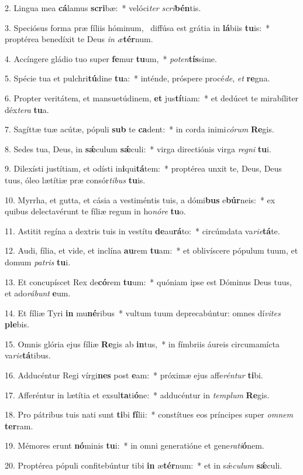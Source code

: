 2. Lingua mea \textbf{cá}lamus \textbf{scri}bæ:~*  velóci\textit{ter} \textit{scri}\textbf{bén}tis.\

3. Speciósus forma præ fíliis hóminum, \dag\  diffúsa est grátia in \textbf{lá}biis \textbf{tu}is:~*  proptérea benedíxit te Deus \textit{in} \textit{æ}\textbf{tér}num.\

4. Accíngere gládio tuo super \textbf{fe}mur \textbf{tu}um,~*  \textit{pot}\textit{en}\textbf{tís}sime.\

5. Spécie tua et pulchri\textbf{tú}dine \textbf{tu}a:~*  inténde, próspere procé\textit{de}, \textit{et} \textbf{re}gna.\

6. Propter veritátem, et mansuetúdinem, \textbf{et} jus\textbf{tí}tiam:~*  et dedúcet te mirabíliter déx\textit{te}\textit{ra} \textbf{tu}a.\

7. Sagíttæ tuæ acútæ, pópuli \textbf{sub} te \textbf{ca}dent:~*  in corda inimi\textit{có}\textit{rum} \textbf{Re}gis.\

8. Sedes tua, Deus, in \textbf{sǽ}culum \textbf{sǽ}culi:~*  virga directiónis virga \textit{re}\textit{gni} \textbf{tu}i.\

9. Dilexísti justítiam, et odísti in\textbf{i}qui\textbf{tá}tem:~*  proptérea unxit te, Deus, Deus tuus, óleo lætítiæ præ consór\textit{ti}\textit{bus} \textbf{tu}is.\

10. Myrrha, et gutta, et cásia a vestiméntis tuis, a dómi\textbf{bus} e\textbf{búr}neis:~*  ex quibus delectavérunt te fíliæ regum in ho\textit{nó}\textit{re} \textbf{tu}o.\

11. Astitit regína a dextris tuis in vestítu \textbf{de}au\textbf{rá}to:~*  circúmdata va\textit{ri}\textit{e}\textbf{tá}te.\

12. Audi, fília, et vide, et inclína \textbf{au}rem \textbf{tu}am:~*  et oblivíscere pópulum tuum, et domum \textit{pa}\textit{tris} \textbf{tu}i.\

13. Et concupíscet Rex de\textbf{có}rem \textbf{tu}um:~*  quóniam ipse est Dóminus Deus tuus, et ado\textit{rá}\textit{bunt} \textbf{e}um.\

14. Et fíliæ Tyri \textbf{in} mu\textbf{né}ribus~*  vultum tuum deprecabúntur: omnes dí\textit{vi}\textit{tes} \textbf{ple}bis.\

15. Omnis glória ejus fíliæ \textbf{Re}gis ab \textbf{in}tus,~*  in fímbriis áureis circumamícta va\textit{ri}\textit{e}\textbf{tá}tibus.\

16. Adducéntur Regi vírgi\textbf{nes} post \textbf{e}am:~*  próximæ ejus affe\textit{rén}\textit{tur} \textbf{ti}bi.\

17. Afferéntur in lætítia et exsul\textbf{ta}ti\textbf{ó}ne:~*  adducéntur in \textit{tem}\textit{plum} \textbf{Re}gis.\

18. Pro pátribus tuis nati sunt \textbf{ti}bi \textbf{fí}lii:~*  constítues eos príncipes super \textit{om}\textit{nem} \textbf{ter}ram.\

19. Mémores erunt \textbf{nó}minis \textbf{tu}i:~*  in omni generatióne et gene\textit{ra}\textit{ti}\textbf{ó}nem.\

20. Proptérea pópuli confitebúntur tibi \textbf{in} æ\textbf{tér}num:~*  et in sǽ\textit{cu}\textit{lum} \textbf{sǽ}culi.\

